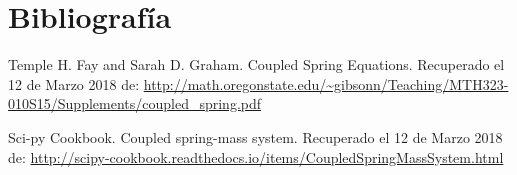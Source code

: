 \documentclass[a4paper]{article}
\begin{document}
\section{Bibliografía}

\noindent
Temple H. Fay and Sarah D. Graham. Coupled Spring Equations. Recuperado el 12 de Marzo 2018 de: \url{http://math.oregonstate.edu/~gibsonn/Teaching/MTH323-010S15/Supplements/coupled_spring.pdf}

Sci-py Cookbook. Coupled spring-mass system. Recuperado el 12 de Marzo 2018 de: \url {http://scipy-cookbook.readthedocs.io/items/CoupledSpringMassSystem.html}
\end{document}
